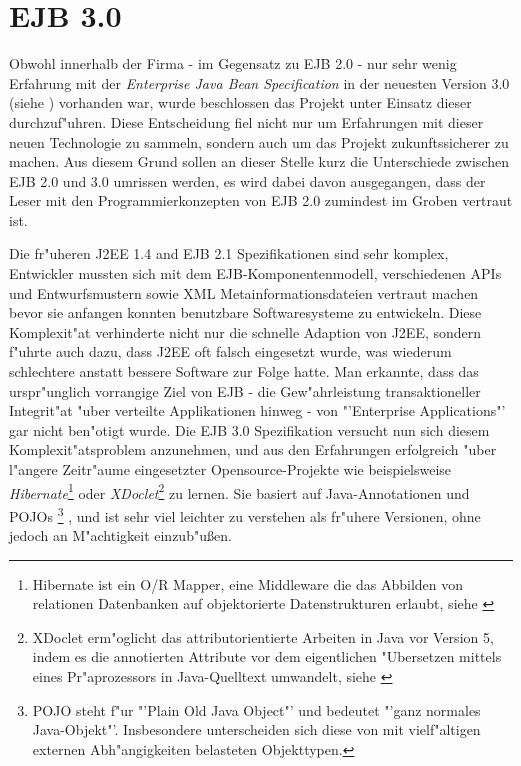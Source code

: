 \section{EJB 3.0}
\label{sec:chap2:ejb3}

Obwohl innerhalb der Firma - im Gegensatz zu EJB 2.0 - nur sehr wenig Erfahrung mit der \emph{Enterprise Java Bean Specification} in der
neuesten Version 3.0 (siehe \cite{EJBHP}) vorhanden war, wurde beschlossen das Projekt unter Einsatz dieser durchzuf"uhren. 
Diese Entscheidung fiel nicht nur um Erfahrungen mit dieser neuen Technologie zu sammeln, sondern auch um das Projekt zukunftssicherer 
zu machen.
Aus diesem Grund sollen an dieser Stelle kurz die Unterschiede zwischen EJB 2.0 und 3.0 umrissen werden, es wird dabei
davon ausgegangen, dass der Leser mit den Programmierkonzepten von EJB 2.0 zumindest im Groben vertraut ist.

Die fr"uheren J2EE 1.4 and EJB 2.1 Spezifikationen sind sehr komplex, Entwickler mussten sich mit dem EJB-Komponentenmodell,
verschiedenen APIs und Entwurfsmustern sowie XML Metainformationsdateien vertraut machen bevor sie anfangen konnten
benutzbare Softwaresysteme zu entwickeln. Diese Komplexit"at verhinderte nicht nur die schnelle Adaption von J2EE,
sondern f"uhrte auch dazu, dass J2EE oft falsch eingesetzt wurde, was wiederum schlechtere anstatt bessere Software zur Folge hatte.
Man erkannte, dass das urspr"unglich vorrangige Ziel von EJB - die Gew"ahrleistung transaktioneller Integrit"at "uber verteilte 
Applikationen hinweg - von "'Enterprise Applications"' gar nicht ben"otigt wurde.
Die EJB 3.0 Spezifikation versucht nun sich diesem Komplexit"atsproblem anzunehmen, und aus den Erfahrungen erfolgreich "uber
l"angere Zeitr"aume eingesetzter Opensource-Projekte 
wie beispielsweise \emph{Hibernate}\footnote{Hibernate ist ein O/R Mapper, eine Middleware die das Abbilden von relationen Datenbanken auf objektorierte
Datenstrukturen erlaubt, siehe \cite{HIBERNATEHP}}
oder \emph{XDoclet}\footnote{XDoclet erm"oglicht das attributorientierte Arbeiten in Java vor Version 5, indem es die annotierten Attribute
vor dem eigentlichen "Ubersetzen mittels eines Pr"aprozessors in Java-Quelltext umwandelt, siehe \cite{XDOCLETHP}}
zu lernen. Sie basiert auf Java-Annotationen und POJOs
\footnote{POJO steht f"ur "'Plain Old Java Object"' und bedeutet "'ganz normales Java-Objekt"'. Insbesondere unterscheiden sich diese
von mit vielf"altigen externen Abh"angigkeiten belasteten Objekttypen.}
, und ist sehr viel leichter zu verstehen als fr"uhere Versionen, ohne jedoch an M"achtigkeit einzub"u\ss en.

